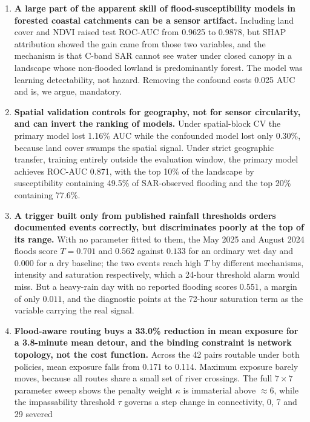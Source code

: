 \documentclass[10pt,twocolumn]{article}
\begin{document}
\begin{enumerate}
\itemsep3pt
\item \textbf{A large part of the apparent skill of flood-susceptibility models
      in forested coastal catchments can be a sensor artifact.} Including land
      cover and NDVI raised test ROC-AUC from 0.9625 to 0.9878, but SHAP
      attribution showed the gain came from those two variables, and the
      mechanism is that C-band SAR cannot see water under closed canopy in a
      landscape whose non-flooded lowland is predominantly forest. The model was
      learning detectability, not hazard. Removing the confound costs 0.025 AUC
      and is, we argue, mandatory.
\item \textbf{Spatial validation controls for geography, not for sensor
      circularity, and can invert the ranking of models.} Under spatial-block CV
      the primary model lost 1.16\% AUC while the confounded model lost only
      0.30\%, because land cover swamps the spatial signal. Under strict
      geographic transfer, training entirely outside the evaluation window, the
      primary model achieves ROC-AUC 0.871, with the top 10\% of the landscape by
      susceptibility containing 49.5\% of SAR-observed flooding and the top 20\%
      containing 77.6\%.
\item \textbf{A trigger built only from published rainfall thresholds orders
      documented events correctly, but discriminates poorly at the top of its
      range.} With no parameter fitted to them, the May 2025 and August 2024
      floods score $T=0.701$ and $0.562$ against $0.133$ for an ordinary wet day
      and $0.000$ for a dry baseline; the two events reach high $T$ by different
      mechanisms, intensity and saturation respectively, which a 24-hour
      threshold alarm would miss. But a heavy-rain day with no reported flooding
      scores $0.551$, a margin of only $0.011$, and the diagnostic points at the
      72-hour saturation term as the variable carrying the real signal.
\item \textbf{Flood-aware routing buys a 33.0\% reduction in mean exposure for a
      3.8-minute mean detour, and the binding constraint is network topology, not
      the cost function.} Across the 42 pairs routable under both policies,
      mean exposure falls from 0.171 to 0.114. Maximum exposure barely moves, because all routes share a small set
      of river crossings. The full $7\times7$ parameter sweep shows the penalty
      weight $\kappa$ is immaterial above $\approx6$, while the impassability
      threshold $\tau$ governs a step change in connectivity, 0, 7 and 29 severed

\end{enumerate}
\end{document}
